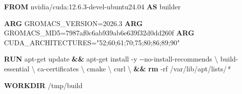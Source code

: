 \documentclass[
  spanish,
  11pt,
  a4paper]{article}
\newenvironment{Shaded}{\begin{snugshade}}{\end{snugshade}}
\newcommand{\AttributeTok}[1]{\textcolor[rgb]{0.13,0.29,0.53}{#1}}
\newcommand{\DataTypeTok}[1]{\textcolor[rgb]{0.13,0.29,0.53}{#1}}
\newcommand{\ExtensionTok}[1]{#1}
\newcommand{\FunctionTok}[1]{\textcolor[rgb]{0.13,0.29,0.53}{\textbf{#1}}}
\newcommand{\KeywordTok}[1]{\textcolor[rgb]{0.13,0.29,0.53}{\textbf{#1}}}
\newcommand{\NormalTok}[1]{#1}
\newcommand{\PreprocessorTok}[1]{\textcolor[rgb]{0.56,0.35,0.01}{\textit{#1}}}
\newcommand{\StringTok}[1]{\textcolor[rgb]{0.31,0.60,0.02}{#1}}
\begin{document}
\begin{Shaded}
\begin{Highlighting}[]
\KeywordTok{FROM}\NormalTok{ nvidia/cuda:12.6.3{-}devel{-}ubuntu24.04 }\KeywordTok{AS}\NormalTok{ builder}

\KeywordTok{ARG}\NormalTok{ GROMACS\_VERSION=2026.3}
\KeywordTok{ARG}\NormalTok{ GROMACS\_MD5=7987af0c6ab939ab6e639f32d0dd260f}
\KeywordTok{ARG}\NormalTok{ CUDA\_ARCHITECTURES=}\StringTok{"52;60;61;70;75;80;86;89;90"}

\KeywordTok{RUN} \ExtensionTok{apt{-}get}\NormalTok{ update }\KeywordTok{\&\&} \ExtensionTok{apt{-}get}\NormalTok{ install }\AttributeTok{{-}y} \AttributeTok{{-}{-}no{-}install{-}recommends} \DataTypeTok{\textbackslash{}}
\NormalTok{    build{-}essential }\DataTypeTok{\textbackslash{}}
\NormalTok{    ca{-}certificates }\DataTypeTok{\textbackslash{}}
\NormalTok{    cmake }\DataTypeTok{\textbackslash{}}
\NormalTok{    curl }\DataTypeTok{\textbackslash{}}
    \KeywordTok{\&\&} \FunctionTok{rm} \AttributeTok{{-}rf}\NormalTok{ /var/lib/apt/lists/}\PreprocessorTok{*}

\KeywordTok{WORKDIR}\NormalTok{ /tmp/build}


\end{Highlighting}
\end{Shaded}
\end{document}

